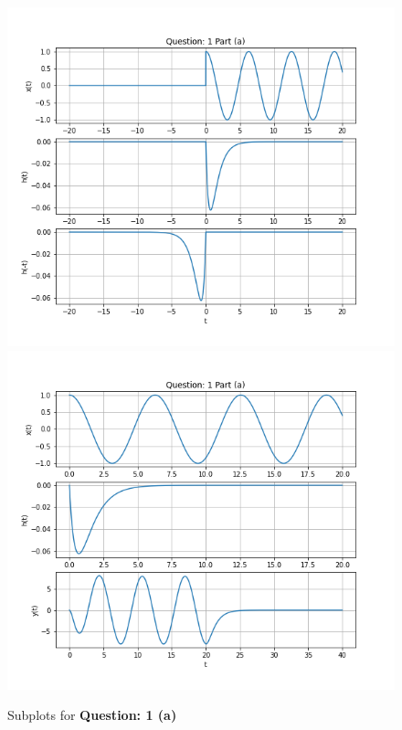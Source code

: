 \documentclass{article}
\begin{document}
    \begin{figure}[ht]
        \centering
        \includegraphics[scale=0.39]{./Assets/1-a-i.png}
        \includegraphics[scale=0.39]{./Assets/1-a-ii.png}
        \caption*{Subplots for \textbf{Question: 1 (a)}}
    \end{figure}
\end{document}
